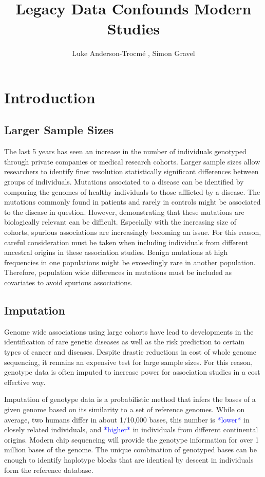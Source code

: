 \documentclass[12pt,twocolumn]{article}
\title{Legacy Data Confounds Modern Studies}
\author{Luke Anderson-Trocm\'e , Simon Gravel}
\newcommand{\todo}[1]{\textcolor{blue}{*#1*}}
\begin{document}
\onecolumn
\maketitle
\tableofcontents
\clearpage
\twocolumn
			\section{Introduction}
	\subsection{Larger Sample Sizes}			
The last 5 years has seen an increase in the number of individuals genotyped through private companies or medical research cohorts. 
Larger sample sizes allow researchers to identify finer resolution statistically significant differences between groups of individuals. 
Mutations associated to a disease can be identified by comparing the genomes of healthy individuals to those afflicted by a disease. 
The mutations commonly found in patients and rarely in controls might be associated to the disease in question.
However, demonstrating that these mutations are biologically relevant can be difficult.
Especially with the increasing size of cohorts, spurious associations are increasingly becoming an issue. 
For this reason, careful consideration must be taken when including individuals from different ancestral origins in these association studies.
Benign mutations at high frequencies in one populations might be exceedingly rare in another population.
Therefore, population wide differences in mutations must be included as covariates to avoid spurious associations.

	\subsection{Imputation}
Genome wide associations using large cohorts have lead to developments in the identification of rare genetic diseases as well as the risk prediction to certain types of cancer and diseases. 
Despite drastic reductions in cost of whole genome sequencing, it remains an expensive test for large sample sizes.
For this reason, genotype data is often imputed to increase power for association studies in a cost effective way.


Imputation of genotype data is a probabilistic method that infers the bases of a given genome based on its similarity to a set of reference genomes.
While on average, two humans differ in about 1/10,000 bases, this number is \todo{lower} in closely related individuals, and \todo{higher} in individuals from different continental origins.
Modern chip sequencing will provide the genotype information for over 1 million bases of the genome.
The unique combination of genotyped bases can be enough to identify haplotype blocks that are identical by descent in individuals form the reference database.
\end{document}
